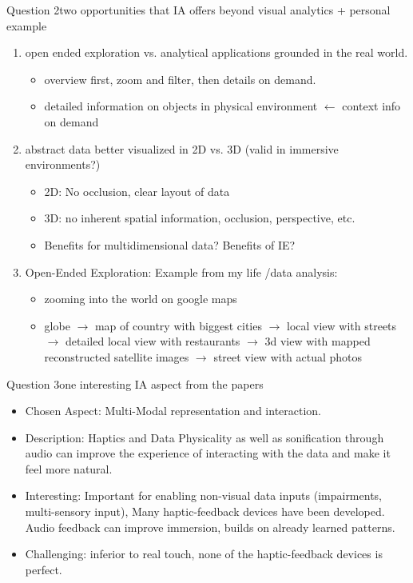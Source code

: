 \documentclass[t,aspectratio=169,divpsnames]{beamer}
\begin{document}
\begin{frame}{Question 2}{two opportunities that IA offers beyond visual analytics + personal example}
\begin{enumerate}
    \item open ended exploration vs. analytical applications grounded in the real world.
        \begin{itemize}
    \item overview first, zoom and filter, then details on demand.

    \item detailed information on objects in physical environment $\leftarrow$ context info on demand
\end{itemize}
    \item abstract data better visualized in 2D vs. 3D (valid in immersive environments?) 
    \begin{itemize}
    \item 2D: No occlusion, clear layout of data
    \item 3D: no inherent spatial information, occlusion, perspective, etc. 
    \item Benefits for multidimensional data? Benefits of IE?
\end{itemize}
    \item Open-Ended Exploration: Example from my life /data analysis:
            \begin{itemize}
    \item zooming into the world on google maps
    \item globe $\rightarrow$ map of country with biggest cities $\rightarrow$ local view with streets $\rightarrow$ detailed local view with restaurants $\rightarrow$ 3d view with mapped reconstructed satellite images $\rightarrow$ street view with actual photos
    
\end{itemize}
\end{enumerate}


\end{frame}

\begin{frame}{Question 3}{one interesting IA aspect from the papers}
\begin{itemize}
    \item Chosen Aspect: Multi-Modal representation and interaction.
    \item Description: Haptics and Data Physicality as well as sonification through audio can improve the experience of interacting with the data and make it feel more natural.  
    \item Interesting: Important for enabling non-visual data inputs (impairments, multi-sensory input), Many haptic-feedback devices have been developed. Audio feedback can improve immersion, builds on already learned patterns.
    \item Challenging: inferior to real touch, none of the haptic-feedback devices is perfect. 
\end{itemize}
\end{frame}
\end{document}
